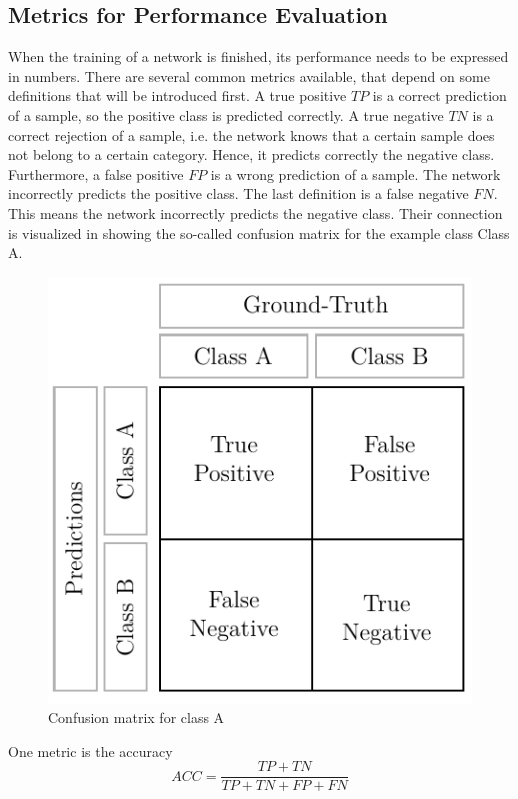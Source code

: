 \subsection{Metrics for Performance Evaluation}
\label{sec:neural-networks-metrics}
When the training of a network is finished, its performance needs to be expressed in numbers.
There are several common metrics available, that depend on some definitions that will be introduced first.
A true positive $TP$ is a correct prediction of a sample, so the positive class is predicted correctly.
A true negative $TN$ is a correct rejection of a sample, i.e. the network knows that a certain sample does not belong to a certain category.
Hence, it predicts correctly the negative class.
Furthermore, a false positive $FP$ is a wrong prediction of a sample.
The network incorrectly predicts the positive class.
The last definition is a false negative $FN$.
This means the network incorrectly predicts the negative class.
Their connection is visualized in  showing the so-called confusion matrix\cite{Fawcett:2006:IRA:1159473.1159475} for the example class Class A.
\begin{figure}
	\centering
	\includegraphics[]{images/confusion_matrix.pdf}
	\caption[Confusion matrix]{Confusion matrix for class A}
	\label{fig:confusion-matrix}
\end{figure}
One metric is the accuracy
\begin{equation}
	ACC = \frac{TP + TN}{TP + TN + FP + FN}
\end{equation}
